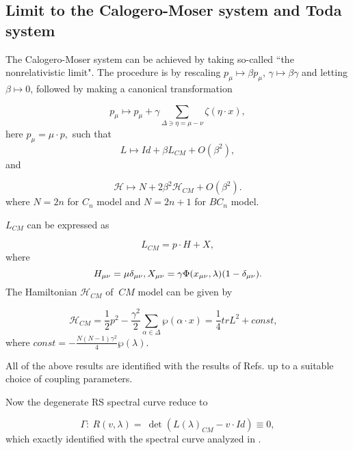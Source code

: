 \documentclass[a4paper,12pt]{article}
\begin{document}
\subsection{Limit to the Calogero-Moser system and Toda system}

The Calogero-Moser system can be achieved by taking
so-called ``the nonrelativistic limit". The procedure is by
rescaling $p_{\mu }\longmapsto
\beta p_{\mu }$, $\gamma \longmapsto \beta \gamma$ and letting $\beta
\longmapsto 0$, followed by making a canonical transformation

\begin{equation}
p_{\mu }\longmapsto p_{\mu }+\gamma \sum_{\Delta \ni \eta
=\mu -\nu }\zeta (\eta \cdot x),
\end{equation}
\noindent here $p_{\mu }=\mu \cdot p,$ such that
\begin{equation}
L\longmapsto Id+\beta L_{CM}+O(\beta ^{2}),
\end{equation}
and

\begin{equation}
\mathcal{H}\longmapsto N+2\beta ^{2}\mathcal{H}_{CM}+O(\beta ^{2}).
\end{equation}
where $N=2n$ for $C_{n}$ model and $N=2n+1$ for $BC_{n}$
model.

$L_{CM}$ can be expressed as

\begin{equation}
L_{CM}=p\cdot H+X,
\end{equation}
where
\begin{equation}
H_{\mu \nu }=\mu \delta _{\mu \nu },  \nonumber \\ X_{\mu
\nu }=\gamma \Phi (x_{\mu \nu },\lambda )(1-\delta _{\mu \nu
}).
\end{equation}
The Hamiltonian $\mathcal{H}_{CM}$ of $\ CM$ model can be
given by

\begin{equation}
\mathcal{H}_{CM}=\frac{1}{2}p^{2}-\frac{\gamma ^{2}}{2}\sum_{\alpha \in
\Delta }\wp(\alpha \cdot x)=\frac{1}{4}trL^{2}+const,\ \ \ \
\label{HCM}
\end{equation}
where $const=-\frac{N(N-1)\gamma ^{2}}{4}\wp(\lambda
).$

All of the above results are identified with the results of
Refs. \cite {op,hp1,bcs2,bcs3,bcs1} up to a suitable choice
of coupling parameters.

Now the degenerate RS spectral curve reduce to

\begin{equation}
\Gamma :\ R(v,\lambda )=~\det (L(\lambda )_{CM}-v\cdot Id)\equiv 0,
\end{equation}
which exactly identified with the spectral curve analyzed in
\cite{hp2,hp3}.
\end{document}
